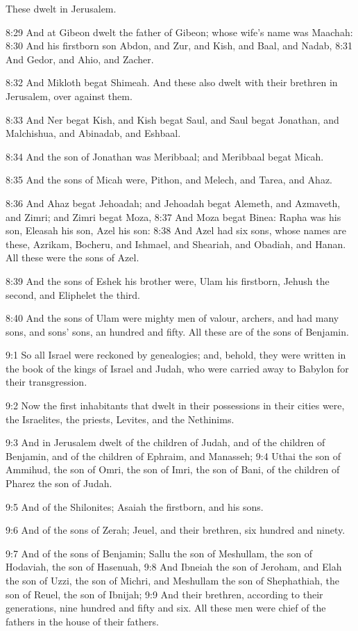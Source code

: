 These dwelt in Jerusalem.

8:29 And at Gibeon dwelt the father of Gibeon; whose wife's name was Maachah: 8:30 And his firstborn son Abdon, and Zur, and Kish, and Baal, and Nadab, 8:31 And Gedor, and Ahio, and Zacher.

8:32 And Mikloth begat Shimeah. And these also dwelt with their brethren in Jerusalem, over against them.

8:33 And Ner begat Kish, and Kish begat Saul, and Saul begat Jonathan, and Malchishua, and Abinadab, and Eshbaal.

8:34 And the son of Jonathan was Meribbaal; and Meribbaal begat Micah.

8:35 And the sons of Micah were, Pithon, and Melech, and Tarea, and Ahaz.

8:36 And Ahaz begat Jehoadah; and Jehoadah begat Alemeth, and Azmaveth, and Zimri; and Zimri begat Moza, 8:37 And Moza begat Binea: Rapha was his son, Eleasah his son, Azel his son: 8:38 And Azel had six sons, whose names are these, Azrikam, Bocheru, and Ishmael, and Sheariah, and Obadiah, and Hanan. All these were the sons of Azel.

8:39 And the sons of Eshek his brother were, Ulam his firstborn, Jehush the second, and Eliphelet the third.

8:40 And the sons of Ulam were mighty men of valour, archers, and had many sons, and sons' sons, an hundred and fifty. All these are of the sons of Benjamin.

9:1 So all Israel were reckoned by genealogies; and, behold, they were written in the book of the kings of Israel and Judah, who were carried away to Babylon for their transgression.

9:2 Now the first inhabitants that dwelt in their possessions in their cities were, the Israelites, the priests, Levites, and the Nethinims.

9:3 And in Jerusalem dwelt of the children of Judah, and of the children of Benjamin, and of the children of Ephraim, and Manasseh; 9:4 Uthai the son of Ammihud, the son of Omri, the son of Imri, the son of Bani, of the children of Pharez the son of Judah.

9:5 And of the Shilonites; Asaiah the firstborn, and his sons.

9:6 And of the sons of Zerah; Jeuel, and their brethren, six hundred and ninety.

9:7 And of the sons of Benjamin; Sallu the son of Meshullam, the son of Hodaviah, the son of Hasenuah, 9:8 And Ibneiah the son of Jeroham, and Elah the son of Uzzi, the son of Michri, and Meshullam the son of Shephathiah, the son of Reuel, the son of Ibnijah; 9:9 And their brethren, according to their generations, nine hundred and fifty and six. All these men were chief of the fathers in the house of their fathers.

